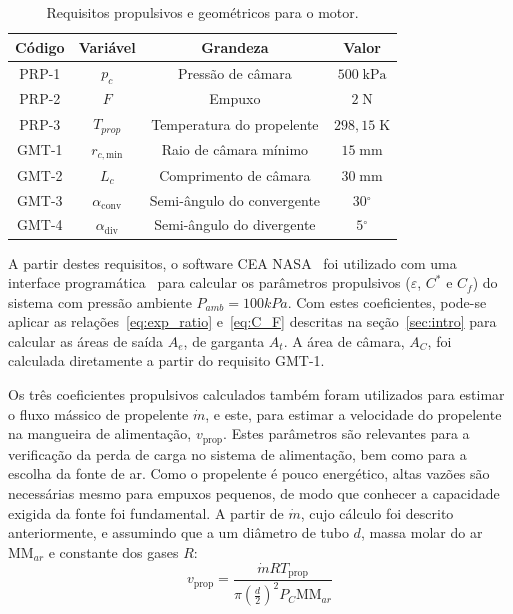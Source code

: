\begin{table}[htpb]
    \centering\begin{tabular}{cccc} \toprule
        Código & Variável & Grandeza & Valor \\ \midrule
        PRP-1 & \(p_c\) & Pressão de câmara & \(500\;\mathrm{kPa}\) \\
        PRP-2 & \(F\) & Empuxo & \(2\;\mathrm{N}\) \\
        PRP-3 &\(T_{prop}\) & Temperatura do propelente & \(298,15\;\mathrm{K}\) \\
        GMT-1 & \(r_{c,\text{min}}\) & Raio de câmara mínimo & \(15\;\mathrm{mm}\) \\
        GMT-2 & \(L_c\) & Comprimento de câmara & \(30\;\mathrm{mm}\) \\
        GMT-3 & \(\alpha_{\text{conv}}\) & Semi-ângulo do convergente & \(30\mathrm{^\circ} \) \\
        GMT-4 & \(\alpha_{\text{div}}\) & Semi-ângulo do divergente & \(5\mathrm{^\circ} \) \\ \bottomrule 
    \end{tabular}
    \caption{Requisitos propulsivos e geométricos para o motor.}\label{tab:requirements}
\end{table}

A partir destes requisitos, o software CEA NASA~\cite{ceanasa} foi utilizado com uma interface programática~\cite{rocketcea} para calcular os parâmetros propulsivos (\(\varepsilon \), \(C^\ast \) e \(C_f\)) do sistema com pressão ambiente \(P_{amb} = 100kPa\). Com estes coeficientes, pode-se aplicar as relações~\ref{eq:exp_ratio} e~\ref{eq:C_F} descritas na seção~\ref{sec:intro} para calcular as áreas de saída \(A_e\), de garganta \(A_t\). A área de câmara, \(A_C\), foi calculada diretamente a partir do requisito GMT-1.  

Os três coeficientes propulsivos calculados também foram utilizados para estimar o fluxo mássico de propelente \(\dot{m}\), e este, para estimar a velocidade do propelente na mangueira de alimentação, \(v_{\text{prop}}\). Estes parâmetros são relevantes para a verificação da perda de carga no sistema de alimentação, bem como para a escolha da fonte de ar. Como o propelente é pouco energético, altas vazões são necessárias mesmo para empuxos pequenos, de modo que conhecer a capacidade exigida da fonte foi fundamental. A partir de \(\dot{m}\), cujo cálculo foi descrito anteriormente, e assumindo que a  um diâmetro de tubo \(d\), massa molar do ar \(\mathrm{MM}_{ar}\) e constante dos gases \(R\):
\begin{equation}
    v_{\text{prop}} = \frac{\dot{m} R T_{\text{prop}}}{\pi {\left(\frac{d}{2}\right)}^2 P_C \mathrm{MM}_{ar}}
\end{equation}

